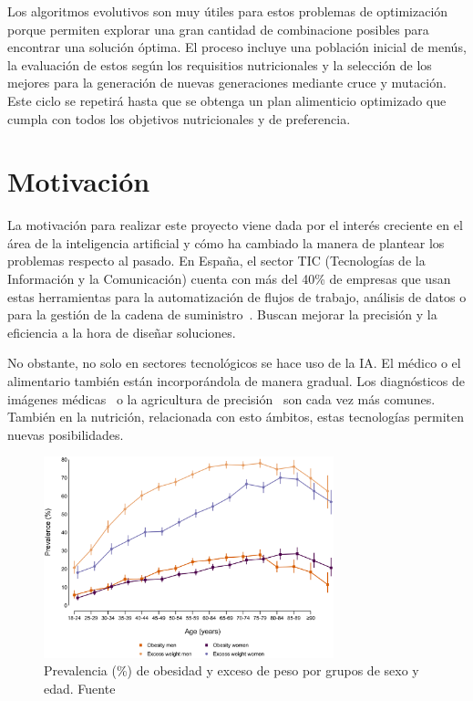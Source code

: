 Los algoritmos evolutivos son muy útiles para estos problemas de optimización porque permiten explorar una gran cantidad de combinacione posibles para encontrar una solución óptima. El proceso incluye una población inicial de menús, la evaluación de estos según los requisitios nutricionales y la selección de los mejores para la generación de nuevas generaciones mediante cruce y mutación. Este ciclo se repetirá hasta que se obtenga un plan alimenticio optimizado que cumpla con todos los objetivos nutricionales y de preferencia.



\section{Motivación}

La motivación para realizar este proyecto viene dada por el interés creciente en el área de la inteligencia artificial y cómo ha cambiado la manera de plantear los problemas respecto al pasado. En España, el sector TIC (Tecnologías de la Información y la Comunicación) cuenta con más del 40\% de empresas que usan estas herramientas para la automatización de flujos de trabajo, análisis de datos o para la gestión de la cadena de suministro~\cite{ontsi2023}. Buscan mejorar la precisión y la eficiencia a la hora de diseñar soluciones.

No obstante, no solo en sectores tecnológicos se hace uso de la IA. El médico o el alimentario también están incorporándola de manera gradual. Los diagnósticos de imágenes médicas~\cite{philips2024} o la agricultura de precisión~\cite{majeed2024} son cada vez más comunes. También en la nutrición, relacionada con esto ámbitos, estas tecnologías permiten nuevas posibilidades.

\begin{figure}[H]
    \centering
    \includegraphics[width=0.75\textwidth]{figures/prevalencia-obesidad.png}
    \caption{Prevalencia (\%) de obesidad y exceso de peso por grupos de sexo y edad. Fuente \cite{ENE-COVID}}
    \label{fig:prevalencia-obesidad}
\end{figure}

